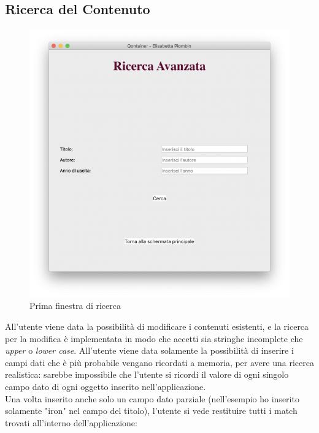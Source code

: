 \documentclass[a4paper,10pt]{article}
\begin{document}
\subsection{Ricerca del Contenuto}
\begin{figure}[H]
	\begin{center}
		\includegraphics[width=\textwidth,keepaspectratio]{immagini/RicercaAvanzata.png}
	\end{center}
	\caption{\label{fig:my-label} Prima finestra di ricerca}
\end{figure}
All'utente viene data la possibilit\`a di modificare i contenuti esistenti, e la ricerca per la modifica \`e implementata in modo che accetti sia stringhe incomplete che \textit{upper} o \textit{lower case}. All'utente viene data solamente la possibilit\`a di inserire i campi dati che \`e pi\`u probabile vengano ricordati a memoria, per avere una ricerca realistica: sarebbe impossibile che l'utente si ricordi il valore di ogni singolo campo dato di ogni oggetto inserito nell'applicazione.\\
Una volta inserito anche solo un campo dato parziale (nell'esempio ho inserito solamente "iron" nel campo del titolo), l'utente si vede restituire tutti i match trovati all'interno dell'applicazione:
\end{document}
